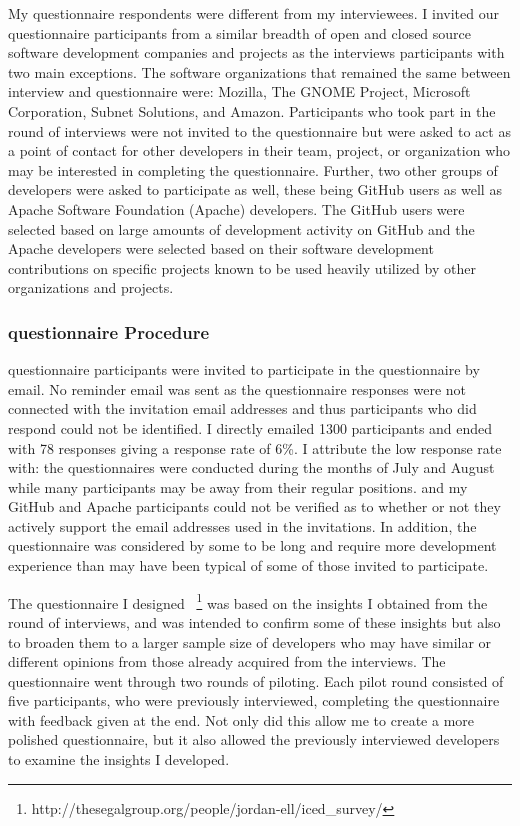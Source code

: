 My questionnaire respondents were different from my interviewees. I invited our questionnaire participants from a similar breadth of open and closed source software development 
companies and projects as the interviews participants with two main exceptions. The software organizations
that remained the same between interview and questionnaire were: Mozilla, The GNOME Project, Microsoft Corporation, 
Subnet Solutions, and Amazon.
Participants who took part in the round of interviews were not invited to the questionnaire but were asked to act as a point of contact for other 
developers in their team, project, or organization who may be interested
in completing the questionnaire. Further, two other groups of developers were asked to
participate as well, these being GitHub users as well as Apache Software Foundation (Apache) developers. The GitHub
users were selected based on large amounts of development activity on GitHub and the Apache developers
were selected based on their software development contributions on specific projects known to be used heavily
utilized by other organizations and projects.

\subsubsection{questionnaire Procedure}

questionnaire participants were invited to participate in the questionnaire by email. No reminder email was sent as the
questionnaire responses were not connected with the invitation email addresses and thus participants who did respond
could not be identified. I directly emailed 1300 participants and ended with 78 responses
giving a response rate of 6\%. I attribute the low response rate with: the questionnaires
were conducted during the months of July and August while many participants may be away from their regular positions.
and my GitHub and Apache participants could not be verified as to whether or not they actively support the
email addresses used in the invitations. In addition, the questionnaire was considered by some to be long and require
more development experience than may have been typical of some of those invited to participate.

The questionnaire I designed ~\footnote{http://thesegalgroup.org/people/jordan-ell/iced\_survey/}
was based on the insights I obtained from the round of interviews, and was intended to confirm some of these insights but also to broaden them to a larger sample size of developers who may have similar
or different opinions from those already acquired from the interviews. The questionnaire went through two rounds of
piloting. Each pilot round consisted of five participants, who were previously interviewed, completing the questionnaire
with feedback given at the end. Not only did this allow me to create a more polished questionnaire, but it also allowed 
the previously interviewed developers to examine the insights I developed. 

